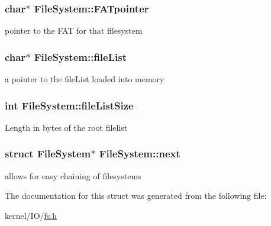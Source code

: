 \subsubsection[{\texorpdfstring{F\+A\+Tpointer}{FATpointer}}]{\setlength{\rightskip}{0pt plus 5cm}char$\ast$ File\+System\+::\+F\+A\+Tpointer}\hypertarget{structFileSystem_a3e1cf4a9014004a11da7c33dab43e5a5}{}\label{structFileSystem_a3e1cf4a9014004a11da7c33dab43e5a5}
pointer to the F\+AT for that filesystem 
\subsubsection[{\texorpdfstring{file\+List}{fileList}}]{\setlength{\rightskip}{0pt plus 5cm}char$\ast$ File\+System\+::file\+List}\hypertarget{structFileSystem_a5557603bd4758e4f1c723931beab9870}{}\label{structFileSystem_a5557603bd4758e4f1c723931beab9870}
a pointer to the file\+List loaded into memory 
\subsubsection[{\texorpdfstring{file\+List\+Size}{fileListSize}}]{\setlength{\rightskip}{0pt plus 5cm}int File\+System\+::file\+List\+Size}\hypertarget{structFileSystem_a2317b8632ea9ed2aeebb92bb2c085a13}{}\label{structFileSystem_a2317b8632ea9ed2aeebb92bb2c085a13}
Length in bytes of the root filelist 
\subsubsection[{\texorpdfstring{next}{next}}]{\setlength{\rightskip}{0pt plus 5cm}struct {\bf File\+System}$\ast$ File\+System\+::next}\hypertarget{structFileSystem_ab4ddc9a8bdbe8207f08d140629eb8e42}{}\label{structFileSystem_ab4ddc9a8bdbe8207f08d140629eb8e42}
allows for easy chaining of filesystems 

The documentation for this struct was generated from the following file\+:\begin{DoxyCompactItemize}
\item 
kernel/\+I\+O/\hyperlink{fs_8h}{fs.\+h}\end{DoxyCompactItemize}
